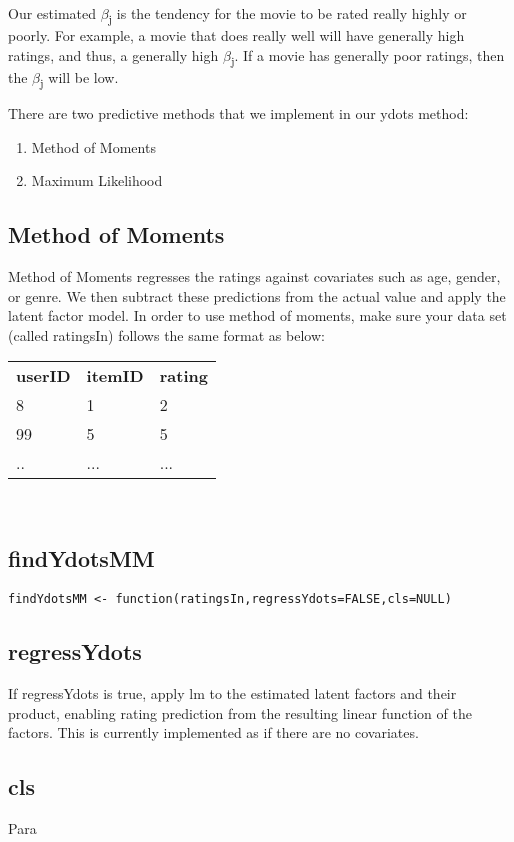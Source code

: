 \documentclass[a4paper,man,natbib]{apa6}
\begin{document}
Our estimated $\beta$\textsubscript j is the tendency for the movie to be rated really highly or poorly. For example, a movie that does really well will have generally high ratings, and thus, a generally high $\beta$\textsubscript j. If a movie has generally poor ratings, then the $\beta$\textsubscript j will be low.

There are two predictive methods that we implement in our ydots method:
\begin{enumerate}

\item Method of Moments
\item Maximum Likelihood 

\end{enumerate}

\subsection{Method of Moments}
Method of Moments regresses the ratings against covariates such as age, gender, or genre. We then subtract these predictions from the actual value and apply the latent factor model. In order to use method of moments, make sure your data set (called ratingsIn) follows the same format as below: \\


\begin{tabular}{l l l}

\textbf{userID} & \textbf{itemID} & \textbf{rating}\\

8 & 1& 2\\
99 & 5& 5 \\
.. & ... & ... \\
\end{tabular}
\\

\subsection{findYdotsMM}

\begin{lstlisting}
findYdotsMM <- function(ratingsIn,regressYdots=FALSE,cls=NULL)
\end{lstlisting}
\subsection{regressYdots}
If regressYdots is true, apply lm to the estimated latent factors and their product, enabling rating prediction from the resulting linear function of the factors. This is currently implemented as if there are no covariates. 
\subsection{cls}
Para
\end{document}
